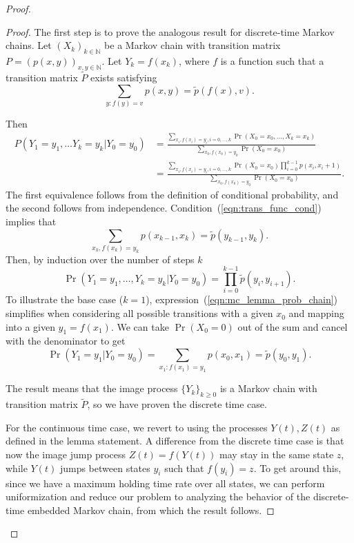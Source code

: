 \documentclass[11pt]{article}
\begin{document}
\begin{proof}
\begin{proof}
The first step is to prove the analogous result for discrete-time Markov chains. Let $(X_k)_{k\in \mathbb{N}}$ be a Markov chain with transition matrix $P=(p(x,y))_{x,y\in \mathbb{N}}$. Let $Y_k = f(x_k)$, where $f$ is a function such that a transition matrix $\tilde P$ exists satisfying
\begin{equation} \label{eqn:trans_func_cond}
\sum_{y:f(y)=v} p(x,y) = \tilde p(f(x),v).
\end{equation}

Then
\begin{equation} \label{eqn:mc_lemma_prob_chain}
\begin{aligned}
P(Y_1 = y_1,\ldots Y_k = y_k | Y_0 = y_0) &= \frac{\sum_{x_i,f(x_i)=y_i,i=0,\ldots,k} \Pr(X_0 = x_0,\ldots, X_k = x_k)}{\sum_{x_0,f(x_0)=y_0} \Pr(X_0=x_0)} \\
	&= \frac{\sum_{x_i,f(x_i)=y_i,i=0,\ldots,k} \Pr(X_0=x_0) \prod_{i=0}^{k-1} p(x_i,x_i+1)}{\sum_{x_0,f(x_0)=y_0} \Pr(X_0=x_0)}.
\end{aligned}
\end{equation}
The first equivalence follows from the definition of conditional probability, and the second follows from independence.
Condition~(\ref{eqn:trans_func_cond}) implies that
$$\sum_{x_k,f(x_k)=y_k} p(x_{k-1},x_k) = \tilde p(y_{k-1},y_k).$$
Then, by induction over the number of steps $k$
$$\Pr(Y_1=y_1,\ldots,Y_k=y_k|Y_0=y_0) = \prod_{i=0}^{k-1} \tilde p(y_i,y_{i+1}).$$
To illustrate the base case ($k=1$), expression~(\ref{eqn:mc_lemma_prob_chain}) simplifies when considering all possible transitions with a given $x_0$ and mapping into a given $y_1=f(x_1)$. We can take $\Pr(X_0=0)$ out of the sum and cancel with the denominator to get
$$\Pr(Y_1=y_1|Y_0=y_0) = \sum_{x_1:f(x_1)=y_1} p(x_0,x_1) = \tilde p(y_0,y_1).$$

The result means that the image process $\{Y_k\}_{k\geq 0}$ is a Markov chain with transition matrix $\tilde P$, so we have proven the discrete time case.


For the continuous time case, we revert to using the processes $Y(t),Z(t)$ as defined in the lemma statement. A difference from the discrete time case is that now the image jump process $Z(t)=f(Y(t))$ may stay in the same state $z$, while $Y(t)$ jumps between states $y_i$ such that $f(y_i)=z$. To get around this, since we have a maximum holding time rate over all states, we can perform uniformization and reduce our problem to analyzing the behavior of the discrete-time embedded Markov chain, from which the result follows.
\end{proof}



\end{proof}
\end{document}
